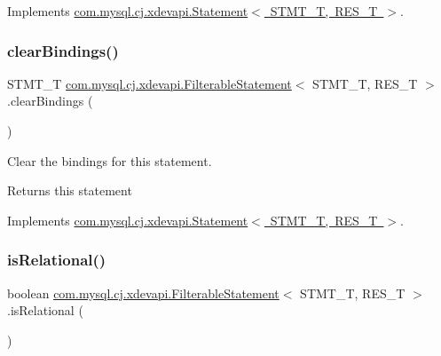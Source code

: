 Implements \mbox{\hyperlink{interfacecom_1_1mysql_1_1cj_1_1xdevapi_1_1_statement_ad4a21af767982f02e50d244b705ee24b}{com.\+mysql.\+cj.\+xdevapi.\+Statement$<$ S\+T\+M\+T\+\_\+\+T, R\+E\+S\+\_\+\+T $>$}}.

\mbox{\label{classcom_1_1mysql_1_1cj_1_1xdevapi_1_1_filterable_statement_a6f81659cd181c72dea83972c18438f56}} 
\subsubsection{\texorpdfstring{clear\+Bindings()}{clearBindings()}}
{\footnotesize\ttfamily S\+T\+M\+T\+\_\+T \mbox{\hyperlink{classcom_1_1mysql_1_1cj_1_1xdevapi_1_1_filterable_statement}{com.\+mysql.\+cj.\+xdevapi.\+Filterable\+Statement}}$<$ S\+T\+M\+T\+\_\+T, R\+E\+S\+\_\+T $>$.clear\+Bindings (\begin{DoxyParamCaption}{ }\end{DoxyParamCaption})}

Clear the bindings for this statement.

\begin{DoxyReturn}{Returns}
this statement 
\end{DoxyReturn}


Implements \mbox{\hyperlink{interfacecom_1_1mysql_1_1cj_1_1xdevapi_1_1_statement_a7be7ea383c05f9b1662b75eed8982ff1}{com.\+mysql.\+cj.\+xdevapi.\+Statement$<$ S\+T\+M\+T\+\_\+\+T, R\+E\+S\+\_\+\+T $>$}}.

\mbox{\label{classcom_1_1mysql_1_1cj_1_1xdevapi_1_1_filterable_statement_a0fc92f86e2ee374cbf5c7fe66d7c7dea}} 
\subsubsection{\texorpdfstring{is\+Relational()}{isRelational()}}
{\footnotesize\ttfamily boolean \mbox{\hyperlink{classcom_1_1mysql_1_1cj_1_1xdevapi_1_1_filterable_statement}{com.\+mysql.\+cj.\+xdevapi.\+Filterable\+Statement}}$<$ S\+T\+M\+T\+\_\+T, R\+E\+S\+\_\+T $>$.is\+Relational (\begin{DoxyParamCaption}{ }\end{DoxyParamCaption})}

